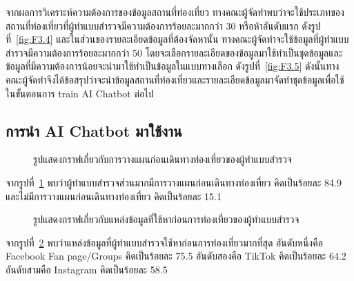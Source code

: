 \documentclass[12pt,oneside,openright,a4paper]{cpe-thai-project}
\begin{document}
จากผลการวิเคราะห์ความต้องการของข้อมูลสถานที่ท่องเที่ยว ทางคณะผู้จัดทำพบว่าจะใช้ประเภทของสถานที่ท่องเที่ยวที่ผู้ทำแบบสำรวจมีความต้องการร้อยละมากกว่า 30 หรือห้าอันดับแรก ดังรูปที่~\ref{fig:F3.4} และในส่วนของรายละเอียดข้อมูลที่ต้องจัดหานั้น ทางคณะผู้จัดทำจะใช้ข้อมูลที่ผู้ทำแบบสำรวจมีความต้องการร้อยละมากกว่า 50 โดยจะเลือกรายละเอียดของข้อมูลมาใช้ทำเป็นชุดข้อมูลและข้อมูลที่มีความต้องการน้อยจะนำมาใช้ทำเป็นข้อมูลในแบบทางเลือก ดังรูปที่~\ref{fig:F3.5} ดังนั้นทางคณะผู้จัดทำจึงได้ข้อสรุปว่าจะนำข้อมูลสถานที่ท่องเที่ยวและรายละเอียดข้อมูลมาจัดทำชุดข้อมูลเพื่อใช้ในขั้นตอนการ train AI Chatbot ต่อไป

\subsection{การนำ AI Chatbot มาใช้งาน}

\begin{figure}[!h]\centering
\setlength{\fboxrule}{0mm}
\caption{รูปแสดงกราฟเกี่ยวกับการวางแผนก่อนเดินทางท่องเที่ยวของผู้ทำแบบสำรวจ}\label{fig:F3.6}
\end{figure}
จากรูปที่~\ref{fig:F3.6} พบว่าผู้ทำแบบสำรวจส่วนมากมีการวางแผนก่อนเดินทางท่องเที่ยว คิดเป็นร้อยละ 84.9 และไม่มีการวางแผนก่อนเดินทางท่องเที่ยว คิดเป็นร้อยละ 15.1 \\

\begin{figure}[!h]\centering
\setlength{\fboxrule}{0mm}
\caption{รูปแสดงกราฟเกี่ยวกับแหล่งข้อมูลที่ใช้หาก่อนการท่องเที่ยวของผู้ทำแบบสำรวจ}\label{fig:F3.7}
\end{figure}
จากรูปที่~\ref{fig:F3.7} พบว่าแหล่งข้อมูลที่ผู้ทำแบบสำรวจใช้หาก่อนการท่องเที่ยวมากที่สุด อันดับหนึ่งคือ Facebook Fan page/Groups คิดเป็นร้อยละ 75.5 อันดับสองคือ TikTok คิดเป็นร้อยละ 64.2 อันดับสามคือ Instagram คิดเป็นร้อยละ 58.5 \newpage
\end{document}
